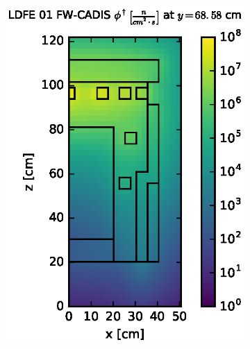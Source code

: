 \begin{figure}[!htb]
\begin{subfigure}{0.4\textwidth}
\includegraphics[max height=0.445\textheight]
{img/dlvn-plots/fwc-adj/flux-ldfe01-slice.eps}
\end{subfigure} ~
\begin{subfigure}{0.4\textwidth}

\end{subfigure}
\end{figure}
